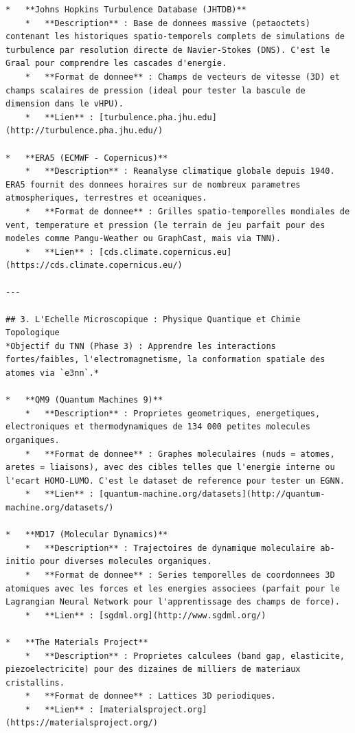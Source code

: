\documentclass[11pt,a4paper]{article}
\begin{document}
\begin{lstlisting}[language={}, caption={}, basicstyle=\ttfamily\footnotesize, breaklines=true]
*   **Johns Hopkins Turbulence Database (JHTDB)**
    *   **Description** : Base de donnees massive (petaoctets) contenant les historiques spatio-temporels complets de simulations de turbulence par resolution directe de Navier-Stokes (DNS). C'est le Graal pour comprendre les cascades d'energie.
    *   **Format de donnee** : Champs de vecteurs de vitesse (3D) et champs scalaires de pression (ideal pour tester la bascule de dimension dans le vHPU).
    *   **Lien** : [turbulence.pha.jhu.edu](http://turbulence.pha.jhu.edu/)

*   **ERA5 (ECMWF - Copernicus)**
    *   **Description** : Reanalyse climatique globale depuis 1940. ERA5 fournit des donnees horaires sur de nombreux parametres atmospheriques, terrestres et oceaniques.
    *   **Format de donnee** : Grilles spatio-temporelles mondiales de vent, temperature et pression (le terrain de jeu parfait pour des modeles comme Pangu-Weather ou GraphCast, mais via TNN).
    *   **Lien** : [cds.climate.copernicus.eu](https://cds.climate.copernicus.eu/)

---

## 3. L'Echelle Microscopique : Physique Quantique et Chimie Topologique
*Objectif du TNN (Phase 3) : Apprendre les interactions fortes/faibles, l'electromagnetisme, la conformation spatiale des atomes via `e3nn`.*

*   **QM9 (Quantum Machines 9)**
    *   **Description** : Proprietes geometriques, energetiques, electroniques et thermodynamiques de 134 000 petites molecules organiques.
    *   **Format de donnee** : Graphes moleculaires (nuds = atomes, aretes = liaisons), avec des cibles telles que l'energie interne ou l'ecart HOMO-LUMO. C'est le dataset de reference pour tester un EGNN.
    *   **Lien** : [quantum-machine.org/datasets](http://quantum-machine.org/datasets/)

*   **MD17 (Molecular Dynamics)**
    *   **Description** : Trajectoires de dynamique moleculaire ab-initio pour diverses molecules organiques.
    *   **Format de donnee** : Series temporelles de coordonnees 3D atomiques avec les forces et les energies associees (parfait pour le Lagrangian Neural Network pour l'apprentissage des champs de force).
    *   **Lien** : [sgdml.org](http://www.sgdml.org/)

*   **The Materials Project**
    *   **Description** : Proprietes calculees (band gap, elasticite, piezoelectricite) pour des dizaines de milliers de materiaux cristallins.
    *   **Format de donnee** : Lattices 3D periodiques.
    *   **Lien** : [materialsproject.org](https://materialsproject.org/)


\end{lstlisting}
\end{document}

